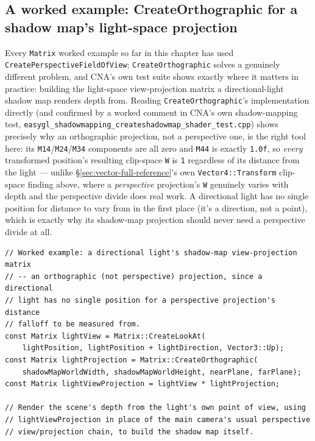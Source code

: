 \subsection{A worked example: CreateOrthographic for a shadow map's light-space projection}

Every \texttt{Matrix} worked example so far in this chapter has used
\texttt{CreatePerspectiveFieldOfView}; \texttt{CreateOrthographic} solves a genuinely different
problem, and CNA's own test suite shows exactly where it matters in practice: building the
light-space view-projection matrix a directional-light shadow map renders depth from. Reading
\texttt{CreateOrthographic}'s implementation directly (and confirmed by a worked comment in
CNA's own shadow-mapping test, \texttt{easygl\_shadowmapping\_createshadowmap\_shader\_test.cpp})
shows precisely why an orthographic projection, not a perspective one, is the right tool here:
its \texttt{M14}/\texttt{M24}/\texttt{M34} components are all zero and \texttt{M44} is exactly
\texttt{1.0f}, so \emph{every} transformed position's resulting clip-space \texttt{W} is
\texttt{1} regardless of its distance from the light --- unlike
\S\ref{sec:vector-full-reference}'s own \texttt{Vector4::Transform} clip-space finding above,
where a \emph{perspective} projection's \texttt{W} genuinely varies with depth and the
perspective divide does real work. A directional light has no single position for distance to
vary from in the first place (it's a direction, not a point), which is exactly why its
shadow-map projection should never need a perspective divide at all.

\begin{lstlisting}
// Worked example: a directional light's shadow-map view-projection matrix
// -- an orthographic (not perspective) projection, since a directional
// light has no single position for a perspective projection's distance
// falloff to be measured from.
const Matrix lightView = Matrix::CreateLookAt(
    lightPosition, lightPosition + lightDirection, Vector3::Up);
const Matrix lightProjection = Matrix::CreateOrthographic(
    shadowMapWorldWidth, shadowMapWorldHeight, nearPlane, farPlane);
const Matrix lightViewProjection = lightView * lightProjection;

// Render the scene's depth from the light's own point of view, using
// lightViewProjection in place of the main camera's usual perspective
// view/projection chain, to build the shadow map itself.
\end{lstlisting}

